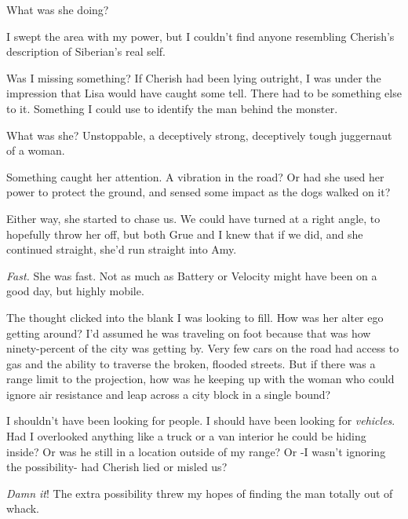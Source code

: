 What was she doing?



I swept the area with my power, but I couldn't find anyone resembling Cherish's description of Siberian's real self.



Was I missing something?  If Cherish had been lying outright, I was under the impression that Lisa would have caught some tell.  There had to be something else to it.  Something I could use to identify the man behind the monster.



What was she?  Unstoppable, a deceptively strong, deceptively tough juggernaut of a woman.



Something caught her attention.  A vibration in the road?  Or had she used her power to protect the ground, and sensed some impact as the dogs walked on it?



Either way, she started to chase us.  We could have turned at a right angle, to hopefully throw her off, but both Grue and I knew that if we did, and she continued straight, she'd run straight into Amy.



\emph{Fast.  }She was fast.  Not as much as Battery or Velocity might have been on a good day, but highly mobile.



The thought clicked into the blank I was looking to fill.  How was her alter ego getting around?  I'd assumed he was traveling on foot because that was how ninety-percent of the city was getting by.  Very few cars on the road had access to gas and the ability to traverse the broken, flooded streets.  But if there was a range limit to the projection, how was he keeping up with the woman who could ignore air resistance and leap across a city block in a single bound?



I shouldn't have been looking for people.  I should have been looking for \emph{vehicles}.  Had I overlooked anything like a truck or a van interior he could be hiding inside?  Or was he still in a location outside of my range?  Or -I wasn't ignoring the possibility- had Cherish lied or misled us?



\emph{Damn it}!  The extra possibility threw my hopes of finding the man totally out of whack.



